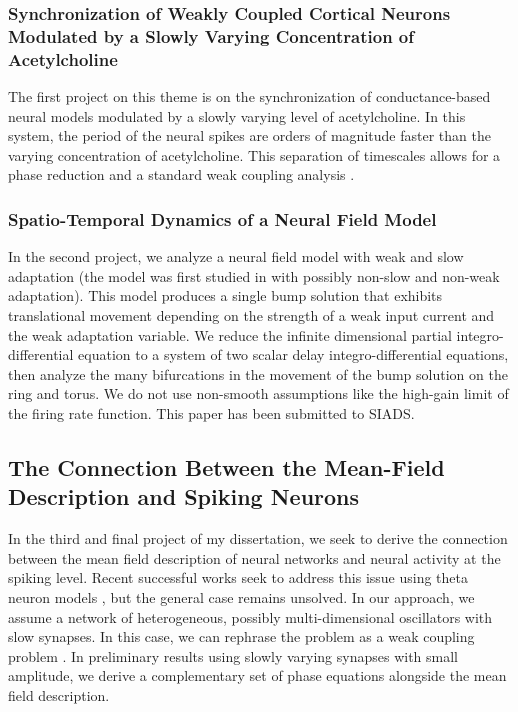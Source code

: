 \documentclass[a4paper,11pt]{article}
\begin{document}
\subsubsection{Synchronization of Weakly Coupled Cortical Neurons Modulated by a Slowly Varying Concentration of Acetylcholine}
The first project on this theme is on the synchronization of conductance-based neural models modulated by a slowly varying level of acetylcholine. In this system, the period of the neural spikes are orders of magnitude faster than the varying concentration of acetylcholine. This separation of timescales allows for a phase reduction and a standard weak coupling analysis \cite{park2016weakly}.

\subsubsection{Spatio-Temporal Dynamics of a Neural Field Model}
In the second project, we analyze a neural field model with weak and slow adaptation (the model was first studied in \cite{pinto_ermentrout_2001_siam} with possibly non-slow and non-weak adaptation). This model produces a single bump solution that exhibits translational movement depending on the strength of a weak input current and the weak adaptation variable. We reduce the infinite dimensional partial integro-differential equation to a system of two scalar delay integro-differential equations, then analyze the many bifurcations in the movement of the bump solution on the ring and torus. We do not use non-smooth assumptions like the high-gain limit of the firing rate function. This paper has been submitted to SIADS.

\subsection{The Connection Between the Mean-Field Description and Spiking Neurons}
In the third and final project of my dissertation, we seek to derive the connection between the mean field description of neural networks and neural activity at the spiking level. Recent successful works seek to address this issue using theta neuron models \cite{laing2014derivation}, but the general case remains unsolved. In our approach, we assume a network of heterogeneous, possibly multi-dimensional oscillators with slow synapses. In this case, we can rephrase the problem as a weak coupling problem \cite{rubinrubin}. In preliminary results using slowly varying synapses with small amplitude, we derive a complementary set of phase equations alongside the mean field description.
\end{document}
